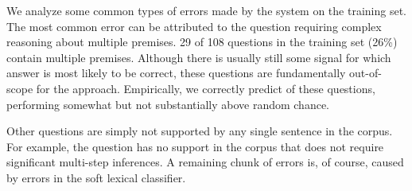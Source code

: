 We analyze some common types of errors made by the system on the training set.
The most common error can be attributed to the question requiring complex reasoning
  about multiple premises.
\num{29} of \num{108} questions in the training set (26\%) contain multiple
  premises.
Although there is usually still some signal for which answer is most likely to be correct,
  these questions are fundamentally out-of-scope for the approach.
Empirically, we correctly predict  of these questions, performing somewhat 
  but not substantially above random chance.

Other questions are simply not supported by any single sentence in the corpus.
For example, the question  has
  no support in the corpus that does not require significant multi-step inferences.
A remaining chunk of errors is, of course, caused by errors in the soft lexical classifier.
